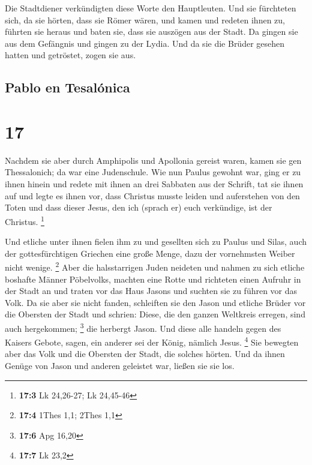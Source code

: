  Die Stadtdiener verkündigten diese Worte den
Hauptleuten. Und sie fürchteten sich, da sie hörten, dass sie Römer
wären,  und kamen und redeten ihnen zu, führten sie
heraus und baten sie, dass sie auszögen aus der Stadt. 
Da gingen sie aus dem Gefängnis und gingen zu der Lydia. Und da sie die
Brüder gesehen hatten und getröstet, zogen sie aus.

\hypertarget{pablo-en-tesaluxf3nica}{%
\subsection{Pablo en Tesalónica}\label{pablo-en-tesaluxf3nica}}

\hypertarget{section-16}{%
\section{17}\label{section-16}}

 Nachdem sie aber durch Amphipolis und Apollonia gereist
waren, kamen sie gen Thessalonich; da war eine Judenschule.
 Wie nun Paulus gewohnt war, ging er zu ihnen hinein und
redete mit ihnen an drei Sabbaten aus der Schrift,  tat
sie ihnen auf und legte es ihnen vor, dass Christus musste leiden und
auferstehen von den Toten und dass dieser Jesus, den ich (sprach er)
euch verkündige, ist der Christus. \footnote{\textbf{17:3} Lk 24,26-27;
  Lk 24,45-46}

 Und etliche unter ihnen fielen ihm zu und gesellten sich
zu Paulus und Silas, auch der gottesfürchtigen Griechen eine große
Menge, dazu der vornehmsten Weiber nicht wenige. \footnote{\textbf{17:4}
  1Thes 1,1; 2Thes 1,1}  Aber die halsstarrigen Juden
neideten und nahmen zu sich etliche boshafte Männer Pöbelvolks, machten
eine Rotte und richteten einen Aufruhr in der Stadt an und traten vor
das Haus Jasons und suchten sie zu führen vor das Volk. 
Da sie aber sie nicht fanden, schleiften sie den Jason und etliche
Brüder vor die Obersten der Stadt und schrien: Diese, die den ganzen
Weltkreis erregen, sind auch hergekommen; \footnote{\textbf{17:6} Apg
  16,20}  die herbergt Jason. Und diese alle handeln gegen
des Kaisers Gebote, sagen, ein anderer sei der König, nämlich Jesus.
\footnote{\textbf{17:7} Lk 23,2}  Sie bewegten aber das
Volk und die Obersten der Stadt, die solches hörten.  Und
da ihnen Genüge von Jason und anderen geleistet war, ließen sie sie los.

